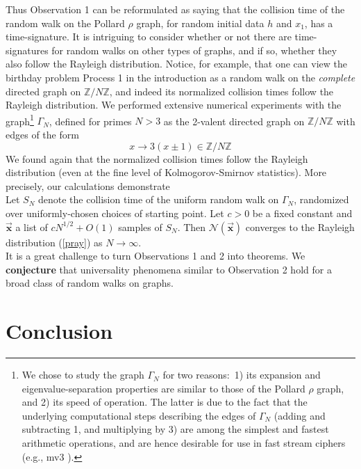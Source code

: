 \documentclass{llncs}
\newtheorem{conj}{Conjecture}
\numberwithin{equation}{section}
\newcommand{\Z}{{\mathbb{Z}}}
\renewcommand\({\left(}
\renewcommand\){\right)}
\begin{document}
Thus Observation 1 can be reformulated as saying that the collision time of the random walk on the Pollard $\rho$ graph, for random initial data $h$ and $x_1$, has a time-signature.
It is   intriguing to consider whether or not there are time-signatures for random walks on other types of  graphs, and if so, whether they also follow the Rayleigh distribution.  Notice, for example, that one can view the birthday problem   Process 1 in the introduction as a random walk on the {\it complete} directed graph on $\Z/N\Z$, and indeed its normalized collision times follow the Rayleigh distribution. We performed extensive numerical experiments with the  graph\footnote{We chose to study the graph  $\Gamma_N$ for two reasons:~1) its expansion and eigenvalue-separation properties are similar to those of the Pollard $\rho$ graph, and 2)  its speed of operation.  The latter is due to the fact that   the underlying computational steps describing the edges of $\Gamma_N$ (adding and subtracting 1, and multiplying by 3) are among the simplest and fastest arithmetic operations, and are hence desirable for use in fast stream ciphers (e.g.,  {\sc mv3} \cite{KMMV}).} $\Gamma_N$, defined for primes $N>3$ as the  2-valent directed graph on $\Z/N\Z$ with edges of the form
$$x\rightarrow 3(x\pm 1)\in \Z/N\Z$$
We found again that the normalized collision times follow the Rayleigh distribution (even at the fine level of Kolmogorov-Smirnov statistics).  More precisely, our calculations demonstrate\\

 Let $S_N$ denote the collision time of the uniform random walk on $\Gamma_N$, randomized over uniformly-chosen choices of starting point.
Let $c>0$ be a fixed constant and $\overrightarrow{\mathbf x}$ a list of $cN^{1/2}+O(1)$ samples of  $S_N$.  Then  ${\mathcal N}(\overrightarrow{\mathbf x})$ converges to the Rayleigh distribution (\ref{pray}) as $N\rightarrow\infty$.\\




It is a great challenge to turn Observations 1 and 2 into theorems.  We {\bf conjecture} that   universality phenomena similar to Observation 2 hold for a broad class of random walks on graphs.

\section{Conclusion} \label{sec:conclusion}
\end{document}
